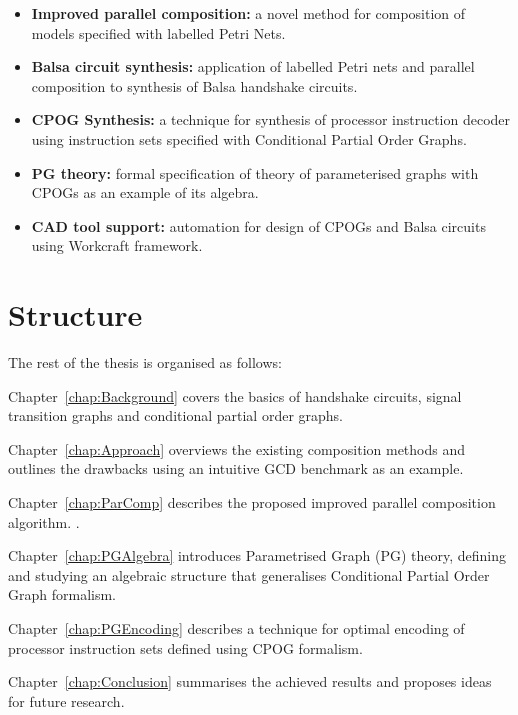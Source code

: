 \begin{itemize}
\item
\textbf{Improved parallel composition:} a novel method for composition of models specified with labelled Petri Nets.

\item
\textbf{Balsa circuit synthesis:} application of labelled Petri nets and parallel composition to synthesis of Balsa handshake circuits.

\item
\textbf{CPOG Synthesis:} a technique for synthesis of processor instruction decoder using instruction sets specified with Conditional Partial Order Graphs.

\item
\textbf{PG theory:} formal specification of theory of parameterised graphs with CPOGs as an example of its algebra.

\item
\textbf{CAD tool support:} automation for design of CPOGs and Balsa circuits using Workcraft framework.

\end{itemize}

\section{Structure}

The rest of the thesis is organised as follows:

Chapter~\ref{chap:Background} covers the basics of handshake circuits, signal transition graphs and conditional partial order graphs.

Chapter~\ref{chap:Approach} overviews the existing composition methods and outlines the drawbacks using an intuitive GCD benchmark as an example.

Chapter~\ref{chap:ParComp} describes the proposed improved parallel composition algorithm.  .

Chapter~\ref{chap:PGAlgebra} introduces Parametrised Graph (PG) theory, defining and studying an algebraic structure that generalises Conditional Partial Order Graph formalism.

Chapter~\ref{chap:PGEncoding} describes a technique for optimal encoding of processor instruction sets defined using CPOG formalism.

Chapter~\ref{chap:Conclusion} summarises the achieved results and proposes ideas for future research.

